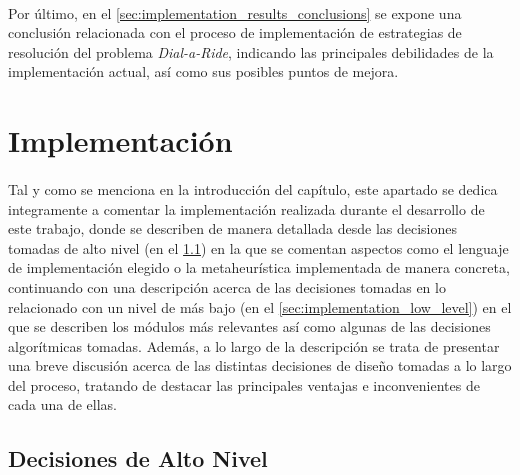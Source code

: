 \documentclass{subfiles}
\begin{document}
      \paragraph{}
      Por último, en el \cref{sec:implementation_results_conclusions} se expone una conclusión relacionada con el proceso de implementación de estrategias de resolución del problema \emph{Dial-a-Ride}, indicando las principales debilidades de la implementación actual, así como sus posibles puntos de mejora.

    \section{Implementación}
    \label{sec:implementation}

      \paragraph{}
      Tal y como se menciona en la introducción del capítulo, este apartado se dedica integramente a comentar la implementación realizada durante el desarrollo de este trabajo, donde se describen de manera detallada desde las decisiones tomadas de alto nivel (en el \cref{sec:implementation_high_level}) en la que se comentan aspectos como el lenguaje de implementación elegido o la metaheurística implementada de manera concreta, continuando con una descripción acerca de las decisiones tomadas en lo relacionado con un nivel de más bajo (en el \cref{sec:implementation_low_level}) en el que se describen los módulos más relevantes así como algunas de las decisiones algorítmicas tomadas. Además, a lo largo de la descripción se trata de presentar una breve discusión acerca de las distintas decisiones de diseño tomadas a lo largo del proceso, tratando de destacar las principales ventajas e inconvenientes de cada una de ellas.

      \subsection{Decisiones de Alto Nivel}
      \label{sec:implementation_high_level}
\end{document}
